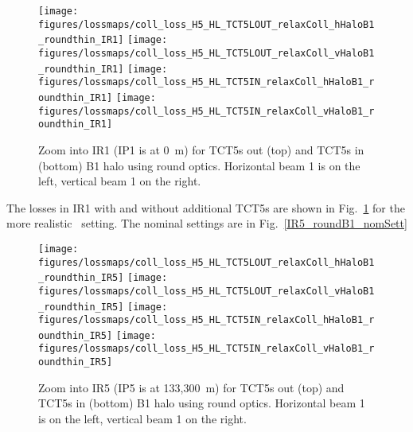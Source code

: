 \begin{figure}[!tb]
\begin{center}
\texttt{[image: figures/lossmaps/coll\_loss\_H5\_HL\_TCT5LOUT\_relaxColl\_hHaloB1\_roundthin\_IR1]}
\texttt{[image: figures/lossmaps/coll\_loss\_H5\_HL\_TCT5LOUT\_relaxColl\_vHaloB1\_roundthin\_IR1]}
\texttt{[image: figures/lossmaps/coll\_loss\_H5\_HL\_TCT5IN\_relaxColl\_hHaloB1\_roundthin\_IR1]}
\texttt{[image: figures/lossmaps/coll\_loss\_H5\_HL\_TCT5IN\_relaxColl\_vHaloB1\_roundthin\_IR1]}
\end{center}
\vspace{-0.3cm}
 \caption{Zoom into IR1 (IP1 is at 0~m) for TCT5s out (top) and TCT5s in (bottom) B1 halo using round optics. Horizontal beam 1 is on the left, vertical beam 1 on the right.
  \label{IR1_roundB1}}
\end{figure}

The losses in IR1 with and without additional TCT5s are shown in Fig.~\ref{IR1_roundB1} for the more realistic \twosigmaret~setting. The nominal settings are in Fig.~\ref{IR5_roundB1_nomSett}

\begin{figure}
\begin{center}
\vskip-12mm
\texttt{[image: figures/lossmaps/coll\_loss\_H5\_HL\_TCT5LOUT\_relaxColl\_hHaloB1\_roundthin\_IR5]}
\texttt{[image: figures/lossmaps/coll\_loss\_H5\_HL\_TCT5LOUT\_relaxColl\_vHaloB1\_roundthin\_IR5]}
\texttt{[image: figures/lossmaps/coll\_loss\_H5\_HL\_TCT5IN\_relaxColl\_hHaloB1\_roundthin\_IR5]}
\texttt{[image: figures/lossmaps/coll\_loss\_H5\_HL\_TCT5IN\_relaxColl\_vHaloB1\_roundthin\_IR5]}
\end{center}
\vspace{-0.3cm}
 \caption{Zoom into IR5 (IP5 is at 133,300~m) for TCT5s out (top) and TCT5s in (bottom) B1 halo using round optics. Horizontal beam 1 is on the left, vertical beam 1 on the right.
  \label{IR5_roundB1}}
\end{figure}


